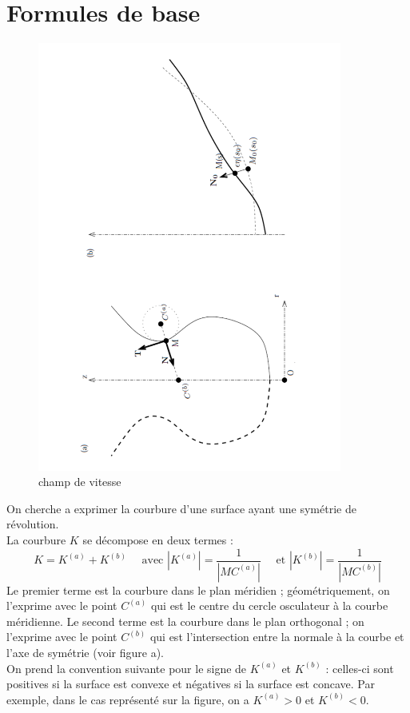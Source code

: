 \documentclass[a4paper]{report}
\begin{document}
\section{Formules de base}
\begin{figure}[!htbp]
\centering
\includegraphics[width=10cm, angle=270]{5}
\caption{champ de vitesse}
\end{figure}
On cherche a exprimer la courbure d'une surface ayant une symétrie de révolution.\\
La courbure $K$ se décompose en deux termes :
$$
K = K^{(a)} + K^{(b)} 
\quad \mbox{ avec }  
\left| K^{(a)} \right|  = \frac{1}{| MC^{(a)} |} 
\quad \mbox{ et } 
\left| K^{(b)} \right| =  \frac{1}{| MC^{(b)} | }
$$
Le premier terme est la courbure dans le plan méridien ; géométriquement, on l'exprime avec le point  $C^{(a)}$ qui est le centre du cercle osculateur à la courbe méridienne. Le second terme est la courbure dans le plan orthogonal ; on l'exprime avec le point $C^{(b)}$ qui est l'intersection entre la normale à la courbe et l'axe de symétrie (voir figure a).\\
On prend la convention suivante pour le signe de $K^{(a)}$ et  $K^{(b)}$ :
celles-ci sont positives si la surface est convexe et négatives si la surface est concave. Par exemple, dans le cas représenté sur la figure, on a $K^{(a)}>0$ et  $K^{(b)}<0$.
\end{document}
